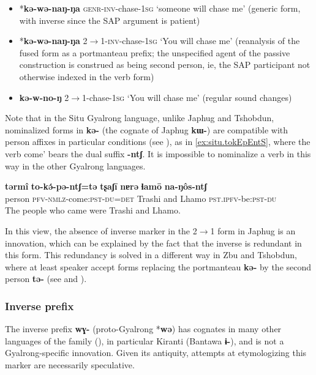 \documentclass[oldfontcommands,oneside,a4paper,11pt]{article}
\newcommand{\ipa}[1]{\mbox{\phon\textbf{#1}}} %
\begin{document}
\begin{itemize}
\item *\ipa{kə-wə-naŋ-ŋa}  \textsc{genr}-\textsc{inv}-chase-\textsc{1sg} `someone will chase me' (generic form, with inverse since the SAP argument is patient)
\item  *\ipa{kə-wə-naŋ-ŋa}  2$\rightarrow$1-\textsc{inv}-chase-\textsc{1sg} `You will chase me' (reanalysis of the fused form as a portmanteau prefix; the unspecified agent of the passive construction is construed as being second person, ie, the SAP participant not otherwise indexed in the verb form)
\item  \ipa{kə-w-no-ŋ} 2$\rightarrow$1-chase-\textsc{1sg} `You will chase me'  (regular sound changes)
\end{itemize}

Note that in the Situ Gyalrong language, unlike Japhug and Tshobdun, nominalized forms in \ipa{kə-} (the cognate of Japhug \ipa{kɯ-}) are compatible with person affixes in particular conditions (see \citealt[11-12]{jacksonlin07}), as in \ref{ex:situ.tokEpEntS}, where the verb  come' bears the dual suffix \ipa{-ntʃ}. It is impossible to nominalize a verb in this way in the other Gyalrong languages.

 \begin{exe}
\ex \label{ex:situ.tokEpEntS}
\gll
\ipa{tərmî}  	\ipa{to-kə́-pə-ntʃ=tə}  	\ipa{tʂaʃī}  	\ipa{nɐrə}  	\ipa{ɬamō}  	\ipa{na-ŋôs-ntʃ}  	\\
person \textsc{pfv-nmlz}-come:\textsc{pst}-\textsc{du=det} Trashi and Lhamo \textsc{pst.ipfv}-be:\textsc{pst}-\textsc{du} \\
\glt The people who came were Trashi and Lhamo.
  \end{exe}

In this view, the absence of inverse marker in the  2$\rightarrow$1 form in Japhug is an innovation, which can be explained by the fact that the inverse is redundant in this form. This redundancy is solved in a different way in Zbu and Tshobdun, where at least speaker accept forms replacing the portmanteau \ipa{kə-} by the second person \ipa{tə-} (see \citealt{jackson02rentongdengdi} and \citealt{gongxun14agreement}).



 \subsubsection{Inverse prefix}
The inverse prefix \ipa{wɣ-} (proto-Gyalrong *\ipa{wə}) has cognates in many other languages of the family (\citealt{jacques12agreement}), in particular Kiranti (Bantawa \ipa{ɨ-}), and is not a Gyalrong-specific innovation. Given its antiquity, attempts at etymologizing this marker are necessarily speculative. 
\end{document}

